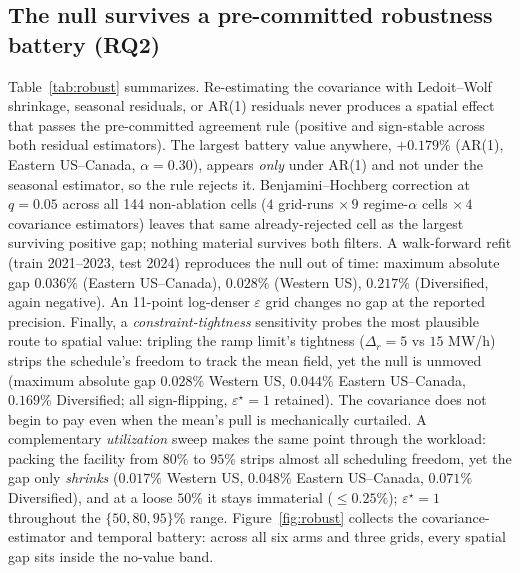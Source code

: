 \documentclass[10pt,twocolumn]{article}
\begin{document}
\subsection{The null survives a pre-committed robustness battery
(RQ2)}\label{sec:res-robust}
Table~\ref{tab:robust} summarizes. Re-estimating the covariance with Ledoit--Wolf
shrinkage, seasonal residuals, or AR(1) residuals never produces a spatial effect
that passes the pre-committed agreement rule (positive and sign-stable across
both residual estimators). The largest battery value anywhere, $+0.179\%$ (AR(1),
Eastern US--Canada, $\alpha=0.30$), appears \emph{only} under AR(1) and not under the
seasonal estimator, so the rule rejects it. Benjamini--Hochberg correction at
$q=0.05$ across all 144 non-ablation cells ($4$ grid-runs $\times\,9$
regime-$\alpha$ cells $\times\,4$ covariance estimators) leaves that same
already-rejected cell as the largest surviving positive gap; nothing material
survives both filters.
A walk-forward refit (train 2021--2023, test 2024) reproduces the null out of
time: maximum absolute gap $0.036\%$ (Eastern US--Canada), $0.028\%$
(Western US), $0.217\%$ (Diversified, again negative). An
11-point log-denser $\varepsilon$ grid changes no gap at the reported precision.
Finally, a \emph{constraint-tightness} sensitivity probes the most plausible route to
spatial value: tripling the ramp limit's tightness ($\Delta_r=5$ vs $15$ MW/h) strips
the schedule's freedom to track the mean field, yet the null is unmoved (maximum
absolute gap $0.028\%$ Western US, $0.044\%$ Eastern US--Canada, $0.169\%$
Diversified; all sign-flipping, $\varepsilon^\star=1$ retained). The covariance does
not begin to pay even when the mean's pull is mechanically curtailed. A complementary
\emph{utilization} sweep makes the same point through the workload: packing the
facility from $80\%$ to $95\%$ strips almost all scheduling freedom, yet the gap only
\emph{shrinks} ($0.017\%$ Western US, $0.048\%$ Eastern US--Canada, $0.071\%$
Diversified), and at a loose $50\%$ it stays immaterial ($\le0.25\%$);
$\varepsilon^\star=1$ throughout the $\{50,80,95\}\%$ range. Figure~\ref{fig:robust} collects the
covariance-estimator and temporal battery: across all six arms and three grids,
every spatial gap sits inside the no-value band.
\end{document}

